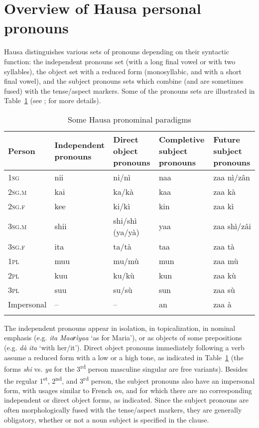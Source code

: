 \documentclass[output=paper]{langscibook}
\begin{document}
\section{Overview of Hausa personal pronouns}\label{sec:Abdoulaye:2}

Hausa distinguishes various sets of pronouns depending on their syntactic function: the independent pronouns set (with a long final vowel or with two syllables), the object set with a reduced form (monosyllabic, and with a short final vowel), and the subject pronouns sets which combine (and are sometimes fused) with the tense/aspect markers. Some of the pronouns sets are illustrated in Table~\ref{tab:Abdoulaye:1} (see \citealt[72ff]{Caron1991}; \citealt[476ff]{Newman2000} for more details).


\begin{table}[ht]
    \centering
    \begin{tabular}{p{2cm}p{2cm}p{2cm}p{2cm}p{2cm}}
    \lsptoprule
    {Person} & {Independent} {pronouns} & {Direct} {object} {pronouns} & {Completive} {subject} {pronouns} &     {Future} {subject} {pronouns} \\
    \hline 
    1\textsc{sg} & nii & ni/nì & naa & zaa nì/zân\\
    2\textsc{sg.m} & kai & ka/kà & kaa & zaa kà\\
    2\textsc{sg.f} & kee & ki/kì & kin & zaa kì\\
    3\textsc{sg.m} & shii & shi/shì (ya/yà) & yaa & zaa shì/zâi\\
    3\textsc{sg.f} & ita & ta/tà & taa & zaa tà\\
    1\textsc{pl} & muu & mu/mù & mun & zaa mù\\
    2\textsc{pl} & kuu & ku/kù & kun & zaa kù\\
    3\textsc{pl} & suu & su/sù & sun & zaa sù\\
    Impersonal & -- & -- & an & zaa à\\
    \lspbottomrule
    \end{tabular}
    \caption{Some Hausa pronominal paradigms}\label{tab:Abdoulaye:1}
\end{table}

The independent pronouns appear in isolation, in topicalization, in nominal emphasis (e.g. \textit{ita} \textit{Maaɍìyaa} ‘as for Maria’), or as objects of some prepositions (e.g. \textit{dà} \textit{ita} ‘with her/it’). Direct object pronouns immediately following a verb assume a reduced form with a low or a high tone, as indicated in Table~\ref{tab:Abdoulaye:1} (the forms \textit{shi} vs. \textit{ya} for the 3\textsuperscript{rd} person masculine singular are free variants). Besides the regular 1\textsuperscript{st}, 2\textsuperscript{nd}, and 3\textsuperscript{rd} person, the subject pronouns also have an impersonal form, with usages similar to French \textit{on}, and for which there are no corresponding independent or direct object forms, as indicated. Since the subject pronouns are often morphologically fused with the tense/aspect markers, they are generally obligatory, whether or not a noun subject is specified in the clause.
\end{document}
